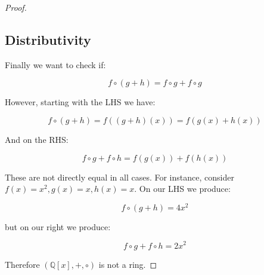 \begin{proof}
\subsection{Distributivity}

Finally we want to check if:

\[f \circ (g + h) = f\circ g + f \circ g\]

However, starting with the LHS we have:

\[f \circ (g+h) = f((g+h)(x)) = f(g(x) + h(x)) \]

And on the RHS:

\[f \circ g + f \circ h = f(g(x)) + f(h(x))\]

These are not directly equal in all cases. For instance, consider $f(x) = x^2 , g(x) = x, h(x) = x$. On our LHS we produce:

\[f \circ (g+h) = 4x^2\]

but on our right we produce:

\[f \circ g + f \circ h = 2x^2\]

Therefore \((\mathbb{Q}[x], +, \circ)\) is not a ring.

\end{proof}
